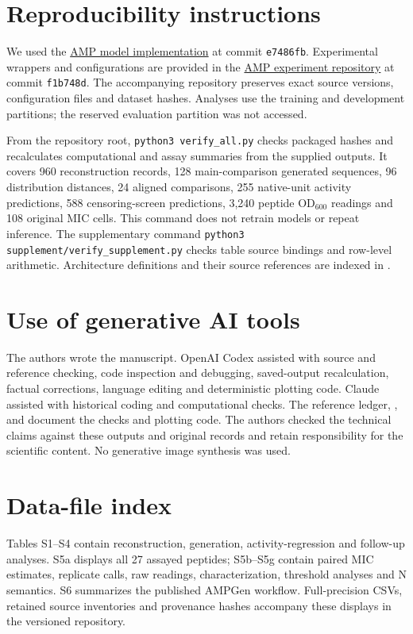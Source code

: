 \documentclass[11pt,a4paper]{article}
\begin{document}
\section*{Reproducibility instructions}
We used the \href{https://github.com/3DHumanRehab/AMP}{AMP model implementation} at commit \texttt{e7486fb}. Experimental wrappers and configurations are provided in the \href{https://github.com/wanghongsheng01/amp-claude-handoff-20261013}{AMP experiment repository} at commit \texttt{f1b748d}. The accompanying repository preserves exact source versions, configuration files and dataset hashes. Analyses use the training and development partitions; the reserved evaluation partition was not accessed.

From the repository root, \texttt{python3 verify\_all.py} checks packaged hashes and recalculates computational and assay summaries from the supplied outputs. It covers 960 reconstruction records, 128 main-comparison generated sequences, 96 distribution distances, 24 aligned comparisons, 255 native-unit activity predictions, 588 censoring-screen predictions, 3,240 peptide OD$_{600}$ readings and 108 original MIC cells. This command does not retrain models or repeat inference. The supplementary command \texttt{python3 supplement/verify\_supplement.py} checks table source bindings and row-level arithmetic. Architecture definitions and their source references are indexed in .

\section*{Use of generative AI tools}
The authors wrote the manuscript. OpenAI Codex assisted with source and reference checking, code inspection and debugging, saved-output recalculation, factual corrections, language editing and deterministic plotting code. Claude assisted with historical coding and computational checks. The reference ledger, ,  and  document the checks and plotting code. The authors checked the technical claims against these outputs and original records and retain responsibility for the scientific content. No generative image synthesis was used.

\section*{Data-file index}
Tables S1--S4 contain reconstruction, generation, activity-regression and follow-up analyses. S5a displays all 27 assayed peptides; S5b--S5g contain paired MIC estimates, replicate calls, raw readings, characterization, threshold analyses and N semantics. S6 summarizes the published AMPGen workflow. Full-precision CSVs, retained source inventories and provenance hashes accompany these displays in the versioned repository.
\end{document}
